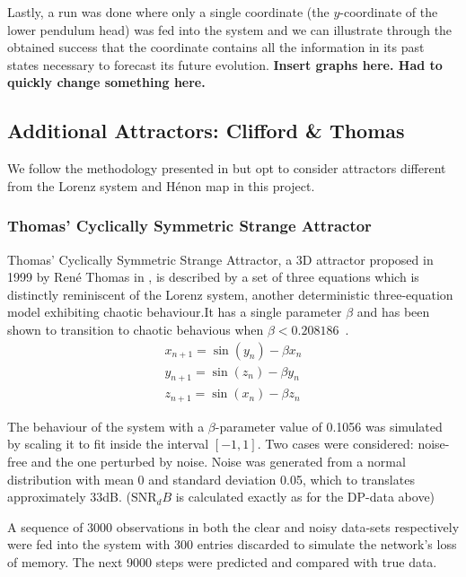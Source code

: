  Lastly, a run was done where only a single coordinate (the $y$-coordinate of the lower pendulum head) was fed into the system and we can illustrate through the obtained success that the coordinate contains all the information in its past states necessary to forecast its future evolution.
 \textbf{Insert graphs here. Had to quickly change something here.}
 

\subsection{Additional Attractors: Clifford \& Thomas}
We follow the methodology presented in \cite{manjunath2021universal} but opt to consider attractors different from the Lorenz system and H\'enon map in this project.

\subsubsection{Thomas' Cyclically Symmetric Strange Attractor}\label{Thomas_Attractor}
Thomas' Cyclically Symmetric Strange Attractor, a 3D attractor proposed in 1999 by Ren\'e Thomas in \cite{ThomasAttractor}, is described by a set of three equations which is distinctly reminiscent of the Lorenz system, another deterministic three-equation model exhibiting chaotic behaviour.It has a single parameter $\beta$ and has been shown to transition to chaotic behavious when $\beta<0.208186$~\cite{Thomas_BetaParameter}.
\begin{eqnarray}\label{eqns_thomas}
  x_{n+1} = \sin(y_n) - \beta{x_n} \\
  y_{n+1} = \sin(z_n) - \beta{y_n} \\
  z_{n+1} = \sin(x_n) - \beta{z_n}
\end{eqnarray}

The behaviour of the system with a $\beta$-parameter value of 0.1056 was simulated by scaling it to fit inside the interval $[-1,1]$. Two cases were considered: noise-free and the one perturbed by noise. Noise was generated from a normal distribution with mean 0 and standard deviation 0.05, which to translates approximately 33dB. 
($\text{SNR}_dB$ is calculated exactly as for the DP-data above)

A sequence of 3000 observations in both the clear and noisy data-sets respectively were fed into the system with 300 entries discarded to simulate the network's loss of memory. The next 9000 steps were predicted and compared with true data.


